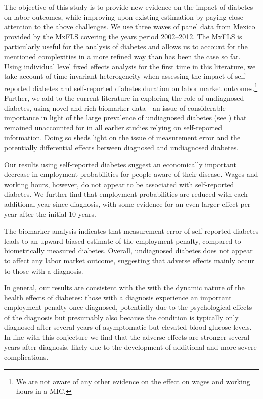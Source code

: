 \documentclass[12pt,english,british]{article}
\begin{document}
The objective of this study is to provide new evidence on the impact of diabetes on labor outcomes, while improving upon existing estimation by paying close attention to the above challenges. We use three waves  of panel data from Mexico provided by the \ac{MxFLS} covering the years period 2002--2012. The \ac{MxFLS} is particularly useful for the analysis of diabetes and allows us to account for the mentioned complexities in a more refined way than has been the case so far. Using individual level fixed effects analysis for the first time in this literature, we take account of time-invariant heterogeneity when assessing the impact of self-reported diabetes and self-reported diabetes duration on labor market outcomes.\footnote{We are not aware of any other evidence on the effect on wages and working hours in a \ac{MIC}.} Further, we add to the current literature in exploring the role of undiagnosed diabetes, using novel and rich biomarker data - an issue of considerable importance in light of the large prevalence of undiagnosed diabetes (see \citet{Beagley2014}) that remained unaccounted for in all earlier studies relying on self-reported information. Doing so sheds light on the issue of measurement error and the potentially differential effects between diagnosed and undiagnosed diabetes. 

Our  results using self-reported diabetes suggest an economically important decrease in employment probabilities for people aware of their disease. Wages and working hours, however, do not appear to be associated with self-reported diabetes. We further find that employment probabilities are reduced with each additional year since diagnosis, with some evidence for an even larger effect per year after the initial 10 years. 

The biomarker analysis indicates that measurement error of self-reported diabetes leads to an upward biased estimate of the employment penalty, compared to biometrically measured diabetes. Overall, undiagnosed diabetes does not appear to affect any labor market outcome, suggesting that adverse effects mainly occur to those with a diagnosis. 

In general, our results are consistent with the with the dynamic nature of the health effects of diabetes: those with a diagnosis experience an important employment penalty once diagnosed, potentially due to the psychological effects of the diagnosis but presumably also because the condition is typically only diagnosed after several years of asymptomatic but elevated blood glucose levels. In line with this conjecture we find that the adverse effects are stronger several years after diagnosis, likely due to the development of additional and more severe complications.
\end{document}
